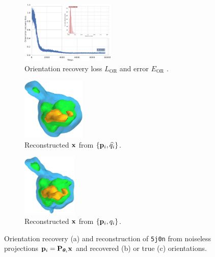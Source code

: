 \begin{figure}[t]
    \centering
    \begin{subfigure}[b]{0.42\textwidth}
        \centering
        \includegraphics[width=\linewidth,height=8em]{figures/5j0n_noise0_ar_aa}
        \caption{Orientation recovery loss $L_\text{OR}$  and error $E_\text{OR}$ .}%
        \label{fig:5j0n-noise0-orientation-recovery}
    \end{subfigure}
    \hfill
    \begin{subfigure}[b]{0.27\linewidth}
        \centering
        \includegraphics[height=8em]{figures/5j0n_reconstruction_noise0}
        \caption{Reconstructed $\mathbf{x}$ from $\{ \mathbf{p}_i, \widehat{q_i} \}$.}%
        \label{fig:5j0n-noise0-reconstruction-recovered}
    \end{subfigure}
    \hfill
    \begin{subfigure}[b]{0.27\linewidth}
        \centering
        \includegraphics[height=8em]{figures/5j0n_reconstruction_GT}
        \caption{Reconstructed $\mathbf{x}$ from $\{ \mathbf{p}_i, q_i \}$.}%
        \label{fig:5j0n-noise0-reconstruction-true}
    \end{subfigure}
    \caption{%
        Orientation recovery (a) and reconstruction of \texttt{5j0n} from noiseless projections $\mathbf{p}_i = \mathbf{P}_{{\boldsymbol{\theta}}_i} \mathbf{x}$ and recovered (b) or true (c) orientations.
    }\label{fig:5j0n-noise0-reconstruction}
\end{figure}

